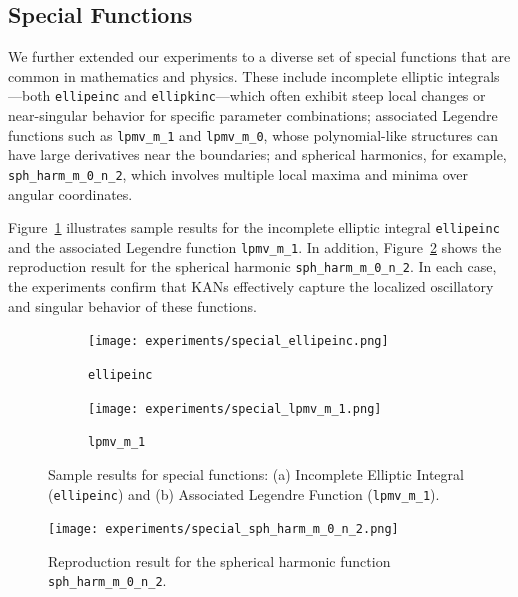 \documentclass[conference]{IEEEtran}
\begin{document}
\subsection{Special Functions}

We further extended our experiments to a diverse set of special functions that
are common in mathematics and physics. These include incomplete elliptic
integrals—both \texttt{ellipeinc} and \texttt{ellipkinc}—which often exhibit
steep local changes or near-singular behavior for specific parameter
combinations; associated Legendre functions such as \texttt{lpmv\_m\_1} and
\texttt{lpmv\_m\_0}, whose polynomial-like structures can have large
derivatives near the boundaries; and spherical harmonics, for example,
\texttt{sph\_harm\_m\_0\_n\_2}, which involves multiple local maxima and minima
over angular coordinates.

Figure~\ref{fig:special_functions} illustrates sample results for the
incomplete elliptic integral \texttt{ellipeinc} and the associated Legendre
function \texttt{lpmv\_m\_1}. In addition, Figure~\ref{fig:spherical_harm}
shows the reproduction result for the spherical harmonic
\texttt{sph\_harm\_m\_0\_n\_2}. In each case, the experiments confirm that KANs
effectively capture the localized oscillatory and singular behavior of these
functions.

\begin{figure}[H]
    \centering
    \begin{subfigure}[b]{0.45\linewidth}
        \centering
        \texttt{[image: experiments/special\_ellipeinc.png]}
        \caption{\texttt{ellipeinc}}
    \end{subfigure}
    \quad
    \begin{subfigure}[b]{0.45\linewidth}
        \centering
        \texttt{[image: experiments/special\_lpmv\_m\_1.png]}
        \caption{\texttt{lpmv\_m\_1}}
    \end{subfigure}
    \caption{Sample results for special functions: (a) Incomplete Elliptic Integral (\texttt{ellipeinc}) and (b) Associated Legendre Function (\texttt{lpmv\_m\_1}).}
    \label{fig:special_functions}
\end{figure}

\begin{figure}[H]
    \centering
    \texttt{[image: experiments/special\_sph\_harm\_m\_0\_n\_2.png]}
    \caption{Reproduction result for the spherical harmonic function \texttt{sph\_harm\_m\_0\_n\_2}.}
    \label{fig:spherical_harm}
\end{figure}
\end{document}
